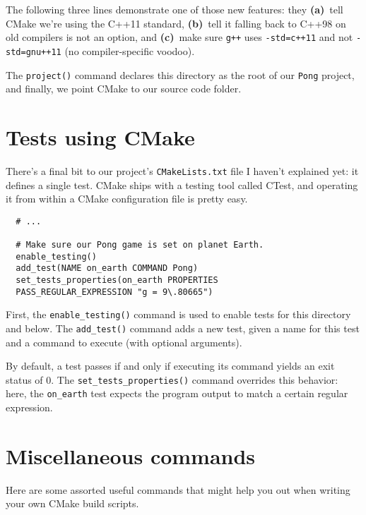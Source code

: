 \documentclass[12pt,a4paper]{article}
\newcommand{\cod}[1]{{\color{red!60!black}\texttt{#1}}}
\begin{document}
  The following three lines demonstrate one of those new features: they 
  \textbf{(a)}~tell CMake we're using the C++11 standard, \textbf{(b)}~tell it 
  falling back to C++98 on old compilers is not an option, and
  \textbf{(c)}~make sure \cod{g++} uses \cod{-std=c++11} and not 
  \cod{-std=gnu++11} 
  (no compiler-specific voodoo).
  
  The \cod{project()} command declares this directory as the root of our 
  \cod{Pong} project, and finally, we point CMake to our source code folder.
  
  \section{Tests using CMake}
  There's a final bit to our project's \cod{CMakeLists.txt} file I haven't 
  explained yet: it defines a single test. CMake ships with a testing tool 
  called CTest, and operating it from within a CMake configuration file is 
  pretty easy.
  
  \begin{lstlisting}
  # ...
  
  # Make sure our Pong game is set on planet Earth.
  enable_testing()
  add_test(NAME on_earth COMMAND Pong)
  set_tests_properties(on_earth PROPERTIES
  PASS_REGULAR_EXPRESSION "g = 9\.80665")
  \end{lstlisting}
  
  First, the \cod{enable\_testing()} command is used to enable tests for this 
  directory and below. The \cod{add\_test()} command adds a new test, given a 
  name for this test and a command to execute (with optional arguments).
  
  By 
  default, a test passes if and only if executing its command yields an exit 
  status of 0. The \cod{set\_tests\_properties()} command overrides this 
  behavior: 
  here, the \cod{on\_earth} test expects the program output to match a certain 
  regular expression.
  
  \section{Miscellaneous commands}
  Here are some assorted useful commands that might help you out when writing 
  your own CMake build scripts.
  
\end{document}
